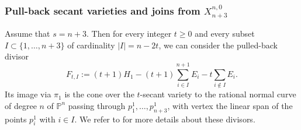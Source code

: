 \documentclass[a4paper,11pt]{article}
\newcommand{\PP}{\mathbb P}
\begin{document}
\subsubsection{Pull-back secant varieties and joins from \texorpdfstring{$X^{n,0}_{n+3}$}{X{n,0}{n+3}}}
Assume that $s=n+3$. Then for every integer $t\ge0$ and every subset $I\subset\{1,\dots, n+3\}$ of cardinality $|I|=n-2t$, we can consider the pulled-back divisor
\begin{equation}\label{pulledback-cones}
F_{t,I}:=(t+1)H_1-(t+1)\sum_{i\in I}^{n+1} E_i-t\sum_{i\notin I}E_i.
\end{equation}
Its image via $\pi_1$ is the cone over the $t$-secant variety to the rational normal curve of degree $n$ of $\PP^n$ passing through $p^1_1,\dots,p^1_{n+3}$, with vertex the linear span of the points $p^1_i$ with $i\in I$. We refer to \cite{BDPn+3} for more details about these divisors.
\end{document}
